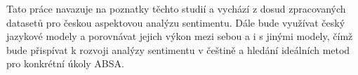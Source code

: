 Tato práce navazuje na poznatky těchto studií a vychází z dosud zpracovaných datasetů pro českou aspektovou analýzu sentimentu. Dále bude využívat český jazykové modely a porovnávat jejich výkon mezi sebou a i s jinými modely, čímž bude přispívat k rozvoji analýzy sentimentu v češtině a hledání ideálních metod pro konkrétní úkoly ABSA.

